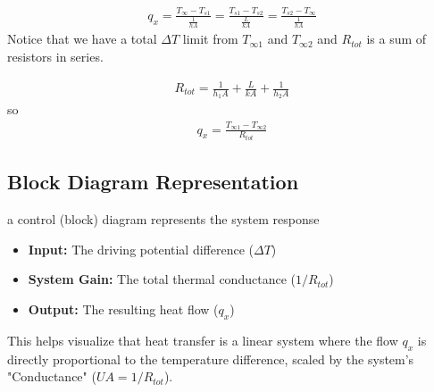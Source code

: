 \documentclass[11pt]{article}
\begin{document}
\begin{align*}
        q_x = \frac{T_{\infty}-T_{s1}}{\frac{1}{hA}}=\frac{T_{s1}-T_{s2}}{\frac{L}{kA}}=\frac{T_{s2}-T_{\infty}}{\frac{1}{hA}}
    \end{align*}
    Notice that we have a total $\Delta T$ limit from $T_{\infty 1}$ and $T_{\infty 2}$ and $R_{tot}$ is a sum of resistors in series.

    \begin{align*}
        R_{tot}=\frac{1}{h_1A}+\frac{L}{kA}+\frac{1}{h_2A} 
    \end{align*}
so
\begin{align*}
    q_x=\frac{T_{\infty 1}-T_{\infty 2}}{R_{tot}}
\end{align*}


    \subsection*{Block Diagram Representation}

 a control (block) diagram represents the system response
\begin{itemize}
    \item \textbf{Input:} The driving potential difference ($\Delta T$)
    \item \textbf{System Gain:} The total thermal conductance ($1/R_{tot}$)
    \item \textbf{Output:} The resulting heat flow ($q_x$)
\end{itemize}

\begin{center}
\end{center}

\noindent This helps visualize that heat transfer is a linear system where the flow $q_x$ is directly proportional to the temperature difference, scaled by the system's "Conductance" ($UA = 1/R_{tot}$).
\end{document}
